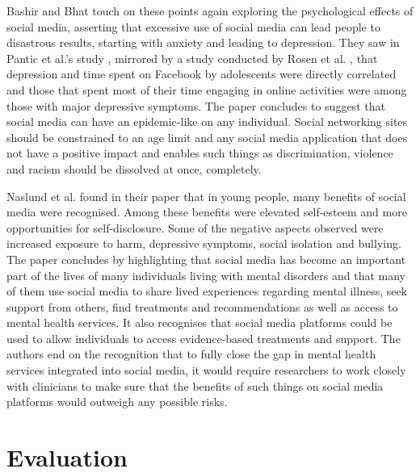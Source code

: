 \documentclass[lettersize,journal]{IEEEtran}
\begin{document}
    Bashir and Bhat \cite{Bashir et al 2017} touch on these points again exploring the psychological effects
    of social media, asserting that excessive use of social media can lead people to disastrous results, starting
    with anxiety and leading to depression. They saw in Pantic et al.'s study \cite{Pantic et al 2012}, mirrored
    by a study conducted by Rosen et al. \cite{Rosen et al 2013}, that depression and time spent on Facebook by
    adolescents were directly correlated and those that spent most of their time engaging in online activities
    were among those with major depressive symptoms. The paper concludes to suggest that social media can have an
    epidemic-like on any individual. Social networking sites should be constrained to an age limit and any
    social media application that does not have a positive impact and enables such things as discrimination, violence
    and racism should be dissolved at once, completely.

    Naslund et al. \cite{Naslund et al 2020} found in their paper that in young people, many benefits of social
    media were recognised. Among these benefits were elevated self-esteem and more opportunities for
    self-disclosure. Some of the negative aspects observed were increased exposure to harm, depressive symptoms,
    social isolation and bullying. The paper concludes by highlighting that social media has become an important part
    of the lives of many individuals living with mental disorders and that many of them use social media to share
    lived experiences regarding mental illness, seek support from others, find treatments and recommendations as
    well as access to mental health services. It also recognises that social media platforms could be used to
    allow individuals to access evidence-based treatments and support. The authors end on the recognition that to
    fully close the gap in mental health services integrated into social media, it would require researchers
    to work closely with clinicians to make sure that the benefits of such things on social media platforms would
    outweigh any possible risks.


\section{Evaluation}
\end{document}

